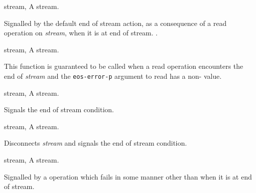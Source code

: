 \begin{optDefinition}
\begin{initoptions}
    \item[stream, \classref{stream}] A stream.
\end{initoptions}
%
\remarks%
Signalled by the default end of stream action, as a consequence of a
read operation on {\em stream\/}, when it is at end of stream.
%
\seealso%
.

\begin{genericargs}
    \item[stream, \classref{buffered-stream}] A stream.
\end{genericargs}
%
\remarks%
This function is guaranteed to be called when a read operation
encounters the end of {\em stream\/} and the {\tt eos-error-p} argument to read
has a non-\nil\/ value.

\begin{specargs}
    \item[stream, \classref{buffered-stream}] A stream.
\end{specargs}
%
\remarks%
Signals the end of stream condition.

\begin{specargs}
    \item[stream, \classref{file-stream}] A stream.
\end{specargs}
%
\remarks%
Disconnects {\em stream\/} and signals the end of stream condition.


%
\begin{genericargs}
    \item[stream, \classref{stream}] A stream.
\end{genericargs}
%
\remarks%
Signalled by a  operation which fails in some manner other
than when it is at end of stream.


\end{optDefinition}
